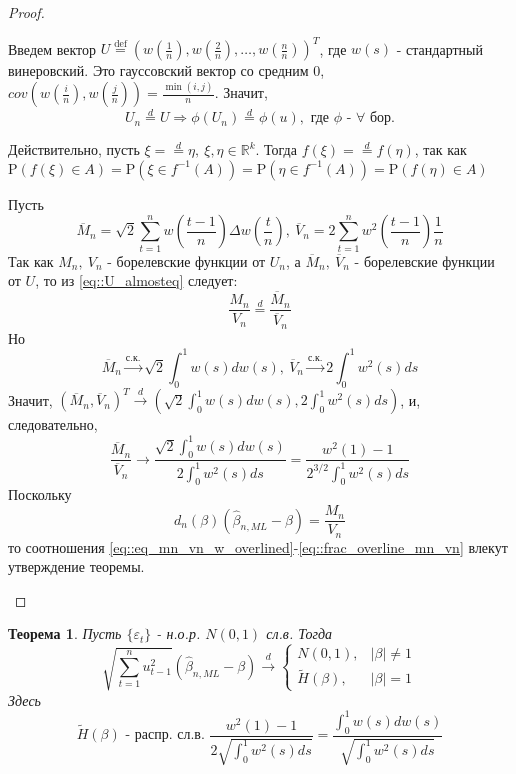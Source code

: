 \documentclass[12pt]{article}
\theoremstyle{basic_theorem}
\newtheorem{theorem}{Теорема}
\newcommand*{\defeq}{\stackrel{\text{def}}{=}}
\def\eps{ \varepsilon }
\def\R{ \mathbb{R} }
\def\P{ \mathrm{P} }
\begin{document}
\begin{proof}
\begin{enumerate}
        Введем вектор $U\defeq\left(w\left(\frac{1}{n}\right),w\left(\frac{2}{n}\right),\ldots,w\left(\frac{n}{n}\right)\right)^T$,
        где $w(s)$ - стандартный винеровский. Это гауссовский вектор со средним 0,
        $cov\left(w\left(\frac{i}{n}\right),w\left(\frac{j}{n}\right)\right)=\frac{\min(i,j)}{n}$.
        Значит,
        \begin{equation}\label{eq::U_almosteq}
            U_n\overset{d}{=}U \Rightarrow \phi(U_n)\overset{d}{=}\phi(u),\text{ где $\phi$ - $\forall$ бор.}
        \end{equation}
        \begin{leftbar}
            Действительно, пусть $\xi=\overset{d}{=}\eta,\ \xi,\eta\in\R^k$. Тогда $f(\xi)=\overset{d}{=}f(\eta)$,
            так как $\P(f(\xi)\in A)=\P(\xi\in f^{-1}(A))=\P(\eta\in f^{-1}(A))=\P(f(\eta)\in A)$
        \end{leftbar}
        Пусть
        \[\overline{M}_n=\sqrt{2}\sum_{t=1}^nw\left(\frac{t-1}{n}\right)\Delta w\left(\frac{t}{n}\right),\ \overline{V}_n=2\sum_{t=1}^nw^2\left(\frac{t-1}{n}\right)\frac{1}{n}\]
        Так как $M_n,\ V_n$ - борелевские функции от $U_n$, а $\overline{M}_n,\ \overline{V}_n$ - борелевские функции от $U$,
        то из \eqref{eq::U_almosteq} следует:
        \begin{equation}\label{eq::eq_mn_vn_w_overlined}
            \frac{M_n}{V_n}\overset{d}{=}\frac{\overline{M}_n}{\overline{V}_n}
        \end{equation}
        Но
        \[\overline{M}_n\xrightarrow{\text{с.к.}}\sqrt{2}\int_0^1w(s)dw(s),\ \overline{V}_n\xrightarrow{\text{с.к.}}2\int_0^1w^2(s)ds\]
        Значит, $(\overline{M}_n,\overline{V}_n)^T\xrightarrow{d}\left(\sqrt{2}\int_0^1w(s)dw(s), 2\int_0^1w^2(s)ds\right)$,
        и, следовательно,
        \begin{equation}\label{eq::frac_overline_mn_vn}
            \frac{\overline{M}_n}{\overline{V}_n}\rightarrow\frac{\sqrt{2}\int_0^1w(s)dw(s)}{2\int_0^1w^2(s)ds}=\frac{w^2(1)-1}{2^{3/2}\int^1_0w^2(s)ds}
        \end{equation}
        Поскольку
        \[d_n(\beta)(\widehat{\beta}_{n,ML}-\beta)=\frac{M_n}{V_n}\]
        то соотношения \eqref{eq::eq_mn_vn_w_overlined}-\eqref{eq::frac_overline_mn_vn} влекут утверждение
        теоремы.
    \end{enumerate}
\end{proof}
\begin{theorem}
    Пусть $\{\eps_t\}$ - н.о.р. $N(0,1)$ сл.в. Тогда
    \[\sqrt{\sum_{t=1}^nu^2_{t-1}}(\widehat{\beta}_{n,ML}-\beta)\xrightarrow{d}\begin{cases}
        N(0,1),& |\beta|\neq1\\
        \widetilde{H}(\beta),& |\beta|=1
    \end{cases}\]
    Здесь
    \[\widetilde{H}(\beta)\text{ - распр. сл.в. }\frac{w^2(1)-1}{2\sqrt{\int_0^1w^2(s)ds}}=\frac{\int_0^1w(s)dw(s)}{\sqrt{\int^1_0w^2(s)ds}}\]
\end{theorem}
\end{document}
